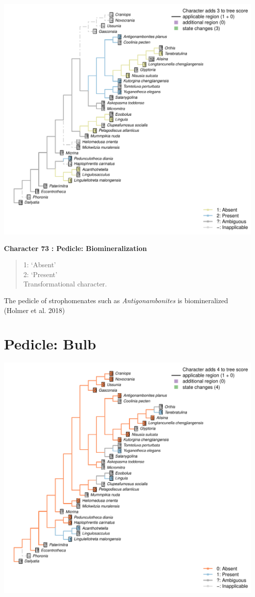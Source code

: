 \documentclass[]{book}
\theoremstyle{definition}
\theoremstyle{definition}
\theoremstyle{definition}
\theoremstyle{remark}
\begin{document}
\includegraphics{Brachiopod_phylogeny_files/figure-latex/unnamed-chunk-5-73.pdf}

\textbf{Character 73 : Pedicle: Biomineralization }

\begin{quote}
1: `Absent'\\
2: `Present'\\
Transformational character.
\end{quote}

The pedicle of strophomenates such as \emph{Antigonambonites} is
biomineralized (Holmer et al. 2018)

\hypertarget{pedicle-bulb}{%
\section*{Pedicle: Bulb}\label{pedicle-bulb}}

\includegraphics{Brachiopod_phylogeny_files/figure-latex/unnamed-chunk-5-74.pdf}
\end{document}
